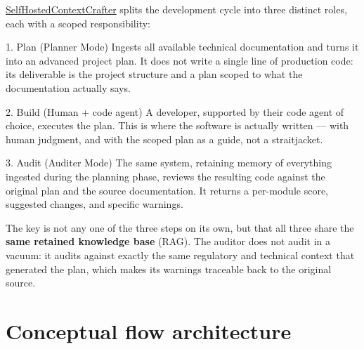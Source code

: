 \documentclass[11pt]{article}
\begin{document}
\href{https://github.com/dramirezbe/SelfHostedContextCrafter}{SelfHostedContextCrafter} splits the development cycle into three distinct roles, each with a scoped responsibility:

\begin{ideabox}{1. Plan (Planner Mode)}
Ingests all available technical documentation and turns it into an advanced project plan. It does not write a single line of production code: its deliverable is the project structure and a plan scoped to what the documentation actually says.
\end{ideabox}

\vspace{0.4em}

\begin{ideabox}{2. Build (Human + code agent)}
A developer, supported by their code agent of choice, executes the plan. This is where the software is actually written --- with human judgment, and with the scoped plan as a guide, not a straitjacket.
\end{ideabox}

\vspace{0.4em}

\begin{ideabox}{3. Audit (Auditer Mode)}
The same system, retaining memory of everything ingested during the planning phase, reviews the resulting code against the original plan and the source documentation. It returns a per-module score, suggested changes, and specific warnings.
\end{ideabox}

\vspace{0.6em}

The key is not any one of the three steps on its own, but that all three share the \textbf{same retained knowledge base} (RAG). The auditor does not audit in a vacuum: it audits against exactly the same regulatory and technical context that generated the plan, which makes its warnings traceable back to the original source.

\section{Conceptual flow architecture}
\end{document}
